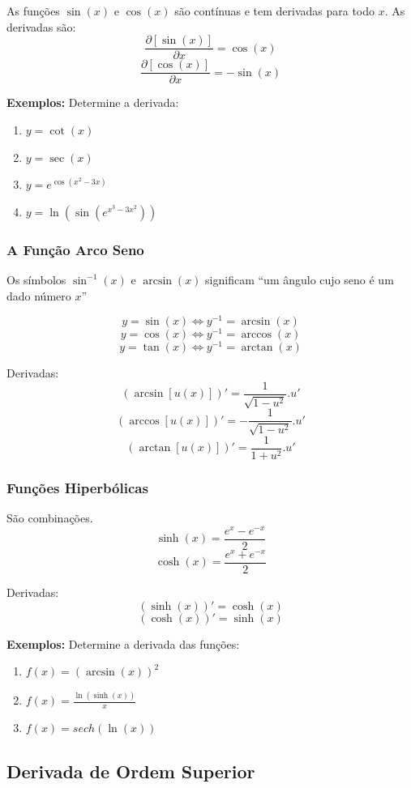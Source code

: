 \documentclass[oneside,a4paper,12pt]{article}
\begin{document}
As funções $\sin(x)$ e $\cos(x)$ são contínuas e tem derivadas para todo $x$. As derivadas são:
$$\dfrac{\partial [\sin(x)]}{\partial x} = \cos(x)$$
$$\dfrac{\partial [\cos(x)]}{\partial x} = -\sin(x)$$

\newpage

{\bf Exemplos: } Determine a derivada:
\begin{enumerate}
	\item $y = \cot(x)$
	\item $y = \sec(x)$
	\item $y = e^{\cos(x^2 - 3x)}$
	\item $y = \ln(\sin(e^{x^3 - 3x^2}))$
\end{enumerate}
\newpage

\subsubsection{A Função Arco Seno}
Os símbolos $\sin^{-1}(x)$ e $\arcsin(x)$ significam ``um ângulo cujo seno é um dado número $x$''

$$y = \sin (x) \Leftrightarrow y^{-1} = \arcsin(x)$$
$$y = \cos (x) \Leftrightarrow y^{-1} = \arccos(x)$$
$$y = \tan (x) \Leftrightarrow y^{-1} = \arctan(x)$$

Derivadas:
$$(\arcsin[u(x)])' = \frac{1}{\sqrt{1 - u^2}}.u'$$
$$(\arccos[u(x)])' = - \frac{1}{\sqrt{1 - u^2}}.u'$$
$$(\arctan[u(x)])' = \frac{1}{1+u^2}.u'$$

\subsubsection{Funções Hiperbólicas}
São combinações.
$$\sinh(x) = \frac{e^x - e^{-x}}{2}$$
$$\cosh(x) = \frac{e^x +e^{-x}}{2}$$

Derivadas:
$$(\sinh(x))' = \cosh(x)$$
$$(\cosh(x))' = \sinh(x)$$

{\bf Exemplos: } Determine a derivada das funções:
\begin{enumerate}
	\item $f(x) = (\arcsin(x))^2$
	\item $f(x) = \frac{\ln(\sinh(x))}{x}$
	\item $f(x) = sech(\ln(x))$
\end{enumerate}

\subsection{Derivada de Ordem Superior}
\end{document}
